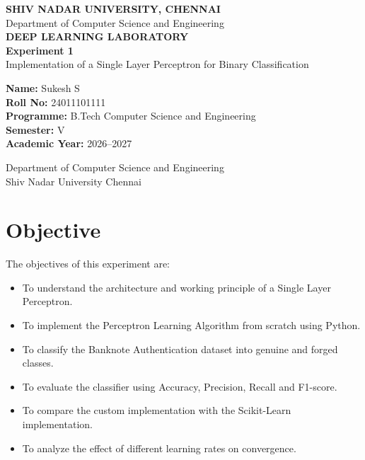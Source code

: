 \documentclass[12pt,a4paper]{article}
\begin{document}
\begin{titlepage}
\centering

\vspace*{1cm}

{\Large \textbf{SHIV NADAR UNIVERSITY, CHENNAI}}\\[0.4cm]

{\large Department of Computer Science and Engineering}\\[1.5cm]

{\Huge \textbf{DEEP LEARNING LABORATORY}}\\[0.8cm]

{\LARGE \textbf{Experiment 1}}\\[0.4cm]

{\Large Implementation of a Single Layer Perceptron for Binary Classification}\\[2cm]

\begin{flushleft}
\textbf{Name:} Sukesh S\\[0.2cm]
\textbf{Roll No:} 24011101111\\[0.2cm]
\textbf{Programme:} B.Tech Computer Science and Engineering\\[0.2cm]
\textbf{Semester:} V\\[0.2cm]
\textbf{Academic Year:} 2026--2027
\end{flushleft}

\vfill

{\large Department of Computer Science and Engineering\\
Shiv Nadar University Chennai}

\end{titlepage}


\section{Objective}

The objectives of this experiment are:

\begin{itemize}
\item To understand the architecture and working principle of a Single Layer Perceptron.
\item To implement the Perceptron Learning Algorithm from scratch using Python.
\item To classify the Banknote Authentication dataset into genuine and forged classes.
\item To evaluate the classifier using Accuracy, Precision, Recall and F1-score.
\item To compare the custom implementation with the Scikit-Learn implementation.
\item To analyze the effect of different learning rates on convergence.
\end{itemize}
\end{document}

